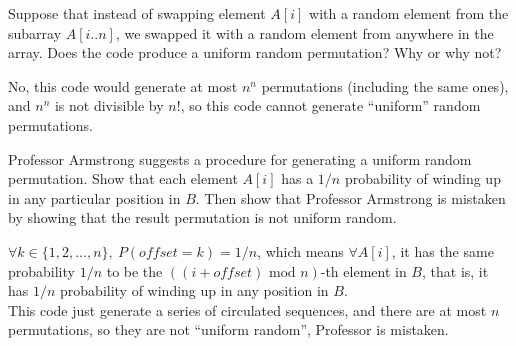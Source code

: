 \documentclass[12pt, a4paper, UTF8]{ctexart}
\begin{document}
\begin{problem}[TC: 5.3-3]
  Suppose that instead of swapping element $A[i]$ with a random element from the 
  subarray $A[i..n]$, we swapped it with a random element from anywhere in the 
  array. Does the code produce a uniform random permutation? Why or why not?
\end{problem}

\begin{solution}
  No, this code would generate at most $n^{n}$ permutations (including the same 
  ones), and $n^{n}$ is not divisible by $n!$, so this code cannot generate ``uniform'' 
  random permutations.
\end{solution}

\begin{problem}[TC: 5.3-4]
  Professor Armstrong suggests a procedure for generating a uniform random permutation. 
  Show that each element $A[i]$ has a $1/n$ probability of winding up in any particular 
  position in $B$. Then show that Professor Armstrong is mistaken by showing that 
  the result permutation is not uniform random.
\end{problem}

\begin{solution}
  $\forall k \in \{ 1,2,...,n \},~P(offset = k) = 1/n$, which means $\forall A[i]$, 
  it has the same probability $1/n$ to be the $((i + offset)\text{ mod }n)$-th 
  element in $B$, that is, it has $1/n$ probability of winding up in any position 
  in $B$.\\
  This code just generate a series of circulated sequences, and there are at most 
  $n$ permutations, so they are not ``uniform random'', Professor is mistaken.
\end{solution}
\end{document}
